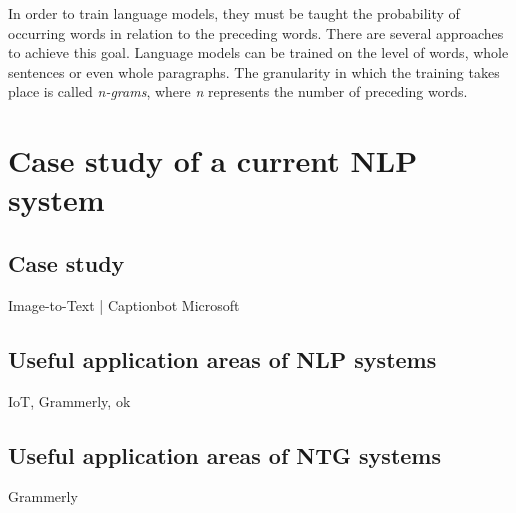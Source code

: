 In order to train language models, they must be taught the probability of occurring words in relation to the preceding words. There are several approaches to achieve this goal. Language models can be trained on the level of words, whole sentences or even whole paragraphs. The granularity in which the training takes place is called \textit{n-grams}, where \textit{n} represents the number of preceding words.

\section{Case study of a current NLP system}

\subsection{Case study}

Image-to-Text | Captionbot Microsoft

\subsection{Useful application areas of NLP systems}

IoT, Grammerly, ok

\subsection{Useful application areas of NTG systems}

Grammerly